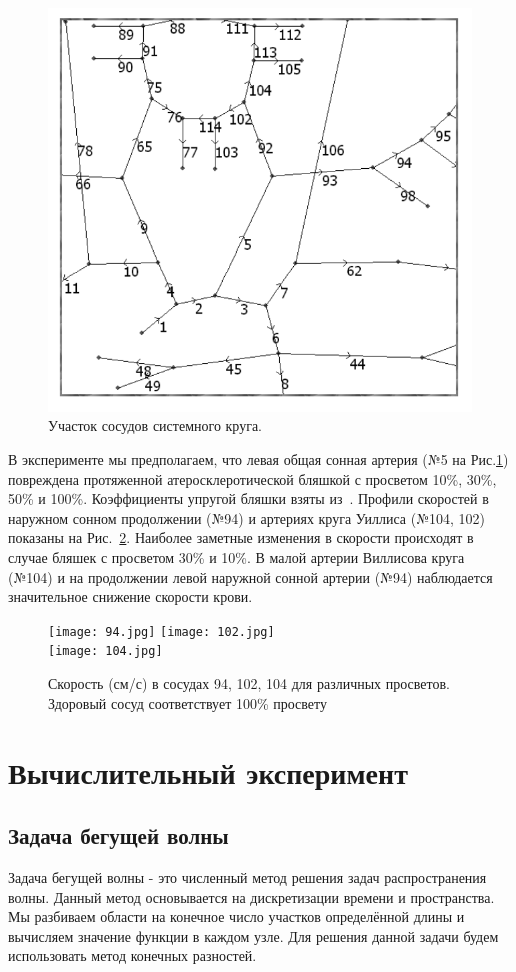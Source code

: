 \begin{figure}[h]
\centering
\includegraphics[width=0.4\linewidth]{chast.png}
\caption{Участок сосудов системного круга.}
\label{ych}
\end{figure}

В эксперименте мы предполагаем, что левая общая сонная артерия (№5 на Рис.\ref{ych}) повреждена протяженной атеросклеротической бляшкой 
с просветом 10\%, 30\%, 50\% и 100\%. Коэффициенты упругой бляшки взяты из~\cite{vassilevski:2011}. 
Профили скоростей в наружном сонном продолжении (№94) и артериях круга Уиллиса (№104, 102) показаны на Рис.~\ref{sc}. 
Наиболее заметные изменения в скорости происходят в случае бляшек с просветом 30\% и 10\%. 
В малой артерии Виллисова круга (№104) и на продолжении левой наружной сонной артерии (№94) наблюдается значительное снижение скорости крови.

\begin{figure}[h]
\centering
\texttt{[image: 94.jpg]}
\texttt{[image: 102.jpg]}\\
\texttt{[image: 104.jpg]}
\caption{Скорость (см/с) в сосудах 94, 102, 104 для различных просветов. Здоровый сосуд
соответствует 100\% просвету}
\label{sc}
\end{figure}


\section{Вычислительный эксперимент}
\subsection*{Задача бегущей волны}

Задача бегущей волны - это численный метод решения задач распространения волны. Данный метод основывается на дискретизации 
времени и пространства. Мы разбиваем области на конечное число участков определённой длины и вычисляем значение функции в каждом узле.
Для решения данной задачи будем использовать метод конечных разностей.

